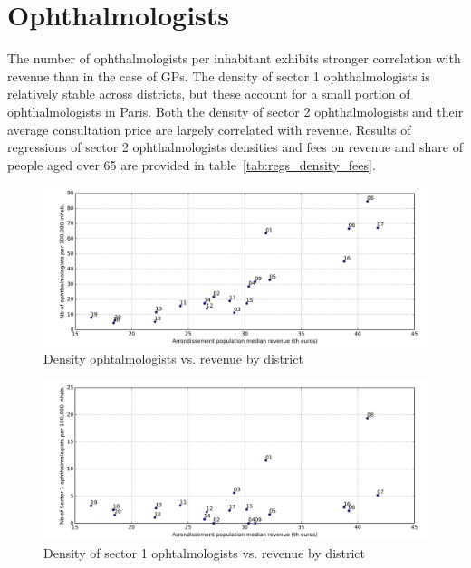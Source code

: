 \documentclass[11pt]{article}
\begin{document}
\section{Ophthalmologists}

The number of ophthalmologists per inhabitant exhibits stronger correlation with revenue than in the case of GPs. The density of sector 1 ophthalmologists is relatively stable across districts, but these account for a small portion of ophthalmologists in Paris. Both the density of sector 2 ophthalmologists and their average consultation price are largely correlated with revenue. Results of regressions of sector 2 ophthalmologists densities and fees on revenue and share of people aged over 65 are provided in table~\ref{tab:regs_density_fees}.

\begin{figure}[H]
    \caption{Density ophtalmologists vs. revenue by district}
	\centering
		\includegraphics[width=16cm]{images/Ophtalmo_Ardt_DensityVsRevenue.png}
\end{figure}

\begin{figure}[H]
    \caption{Density of sector 1 ophtalmologists vs. revenue by district}
	\centering
		\includegraphics[width=16cm]{images/Ophtalmo_Ardt_DensityS1VsRevenue.png}
\end{figure}
\end{document}
